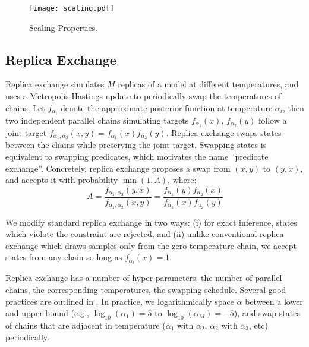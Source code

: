 \begin{figure}
  \centering
  \texttt{[image: scaling.pdf]}
  \caption{Scaling Properties.}\label{scaling}
  \end{figure}

  
\subsection{Replica Exchange}\label{replicaexchange}
Replica exchange \citep{swendsen1986replica} simulates $M$ replicas of a model at different temperatures, and uses a Metropolis-Hastings update to  periodically swap the temperatures of chains.
Let $f_{\alpha_i}$ denote the approximate posterior function at temperature $\alpha_i$, then two independent parallel chains simulating targets $f_{\alpha_1}(x)$, $f_{\alpha_2}(y)$  follow a joint target $f_{\alpha_1, \alpha_2}(x,y) = f_{\alpha_1}(x)f_{\alpha_2}(y)$.
Replica exchange swaps states between the chains while preserving the joint target.
Swapping states is equivalent to swapping predicates, which motivates the name ``predicate exchange''.
Concretely, replica exchange proposes a swap from $(x, y)$ to $(y, x)$, and accepts it with probability $\min(1, A)$, where:
\begin{equation}
A =  \frac{f_{\alpha_1, \alpha_2}(y,x)}{f_{\alpha_1, \alpha_2}(x,y)} = \frac{f_{\alpha_1}(y)f_{\alpha_2}(x)}{f_{\alpha_1}(x)f_{\alpha_2}(y)}
\end{equation}

We modify standard replica exchange in two ways: (i) for exact inference, states which violate the constraint are rejected, and (ii)
unlike conventional replica exchange which draws samples only from the zero-temperature chain, we accept states from any chain so long as $f_{\alpha_i}(x) = 1$.

Replica exchange has a number of hyper-parameters: the number of parallel chains, the corresponding temperatures, the swapping schedule.
Several good practices are outlined in \cite{earl2005parallel}.  In practice, we logarithmically space $\alpha$ between a lower and upper bound (e.g., $\log_{10}(\alpha_1) = 5$ to $\log_{10}(\alpha_M) = -5$), and swap states of chains that are adjacent in temperature ($\alpha_1$ with $\alpha_2$, $\alpha_2$ with $\alpha_3$, etc) periodically.






